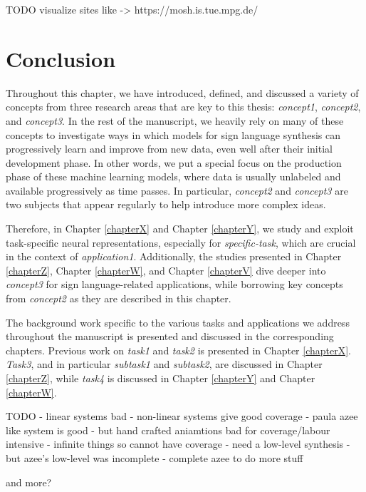 \documentclass[../../main.tex]{subfiles}
\begin{document}
TODO visualize sites like -> https://mosh.is.tue.mpg.de/

\section{Conclusion}

Throughout this chapter, we have introduced, defined, and discussed a variety of concepts from three research areas that are key to this thesis: \textit{concept1}, \textit{concept2}, and \textit{concept3}. In the rest of the manuscript, we heavily rely on many of these concepts to investigate ways in which models for sign language synthesis can progressively learn and improve from new data, even well after their initial development phase. In other words, we put a special focus on the production phase of these machine learning models, where data is usually unlabeled and available progressively as time passes. In particular, \textit{concept2} and \textit{concept3} are two subjects that appear regularly to help introduce more complex ideas.

Therefore, in Chapter \ref{chapterX} and Chapter \ref{chapterY}, we study and exploit task-specific neural representations, especially for \textit{specific-task}, which are crucial in the context of \textit{application1}. Additionally, the studies presented in Chapter \ref{chapterZ}, Chapter \ref{chapterW}, and Chapter \ref{chapterV} dive deeper into \textit{concept3} for sign language-related applications, while borrowing key concepts from \textit{concept2} as they are described in this chapter.

The background work specific to the various tasks and applications we address throughout the manuscript is presented and discussed in the corresponding chapters. Previous work on \textit{task1} and \textit{task2} is presented in Chapter \ref{chapterX}. \textit{Task3}, and in particular \textit{subtask1} and \textit{subtask2}, are discussed in Chapter \ref{chapterZ}, while \textit{task4} is discussed in Chapter \ref{chapterY} and Chapter \ref{chapterW}.


TODO
- linear systems bad
- non-linear systems give good coverage
- paula azee like system is good
- but hand crafted aniamtions bad for coverage/labour intensive - infinite things so cannot have coverage
- need a low-level synthesis
- but azee's low-level was incomplete
- complete azee to do more stuff 

and more?
\end{document}
